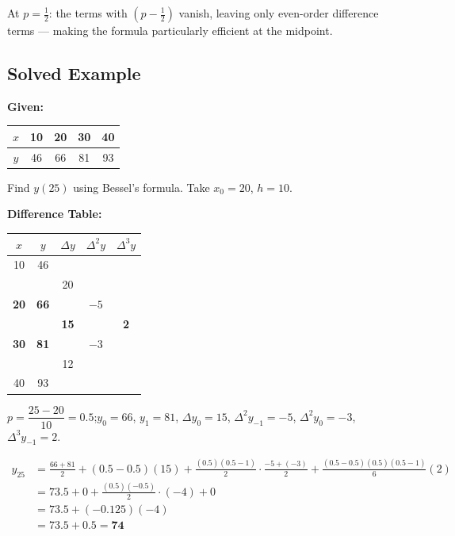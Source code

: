 \documentclass[12pt]{article}
\begin{document}
\begin{notebox}
At $p = \tfrac{1}{2}$: the terms with $(p - \tfrac{1}{2})$ vanish, leaving only even-order difference terms — making the formula particularly efficient at the midpoint.
\end{notebox}

\subsection*{Solved Example}

\begin{exbox}
\textbf{Given:}
\begin{center}
\begin{tabular}{|c|c|c|c|c|}
  \hline
  \rowcolor{primary!80}
  {\color{white}$x$} & {\color{white}10} & {\color{white}20} & {\color{white}30} & {\color{white}40} \\
  \hline
  $y$ & 46 & 66 & 81 & 93 \\
  \hline
\end{tabular}
\end{center}
Find $y(25)$ using Bessel's formula. Take $x_0=20$, $h=10$.

\medskip\textbf{Difference Table:}
\begin{center}
\renewcommand{\arraystretch}{1.3}
\begin{tabular}{|c|c|c|c|c|}
  \hline
  \rowcolor{primary!80}
  {\color{white}$x$} & {\color{white}$y$} & {\color{white}$\Delta y$} & {\color{white}$\Delta^2 y$} & {\color{white}$\Delta^3 y$} \\
  \hline
  10 & 46 & & & \\
  \hline
  \rowcolor{lightbg!50}
  & & 20 & & \\
  \hline
  \rowcolor{accent!10}
  \textbf{20} & \textbf{66} & & $-5$ & \\
  \hline
  \rowcolor{lightbg!50}
  & & \textbf{15} & & \textbf{2} \\
  \hline
  \textbf{30} & \textbf{81} & & $-3$ & \\
  \hline
  \rowcolor{lightbg!50}
  & & 12 & & \\
  \hline
  40 & 93 & & & \\
  \hline
\end{tabular}
\end{center}

$p = \dfrac{25-20}{10} = 0.5$;\quad $y_0=66$,\; $y_1=81$,\; $\Delta y_0=15$,\; $\Delta^2 y_{-1}=-5$,\; $\Delta^2 y_0=-3$,\; $\Delta^3 y_{-1}=2$.

\begin{align*}
  y_{25} &= \frac{66+81}{2} + \left(0.5-0.5\right)(15)
  + \frac{(0.5)(0.5-1)}{2}\cdot\frac{-5+(-3)}{2}
  + \frac{(0.5-0.5)(0.5)(0.5-1)}{6}(2) \\[4pt]
  &= 73.5 + 0 + \frac{(0.5)(-0.5)}{2}\cdot(-4) + 0 \\[4pt]
  &= 73.5 + (-0.125)(-4) \\
  &= 73.5 + 0.5 = \mathbf{74}
\end{align*}
\end{exbox}
\end{document}

